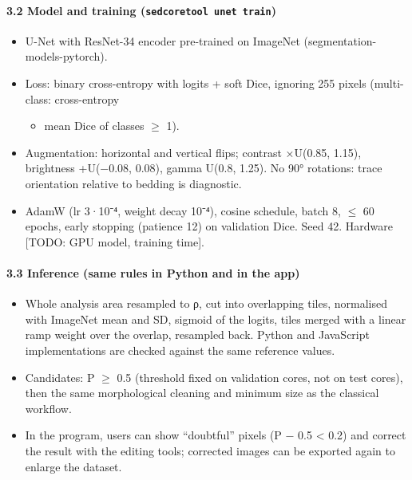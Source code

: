 \documentclass[
  10pt,
]{article}
\providecommand{\tightlist}{%
  \setlength{\itemsep}{0pt}\setlength{\parskip}{0pt}}
\begin{document}
\hypertarget{model-and-training-sedcoretool-unet-train}{%
\paragraph{\texorpdfstring{3.2 Model and training
(\texttt{sedcoretool\ unet\ train})}{3.2 Model and training (sedcoretool unet train)}}\label{model-and-training-sedcoretool-unet-train}}

\begin{itemize}
\tightlist
\item
  U-Net with ResNet-34 encoder pre-trained on ImageNet
  (segmentation-models-pytorch).
\item
  Loss: binary cross-entropy with logits + soft Dice, ignoring 255
  pixels (multi-class: cross-entropy

  \begin{itemize}
  \tightlist
  \item
    mean Dice of classes $\geq$ 1).
  \end{itemize}
\item
  Augmentation: horizontal and vertical flips; contrast ×U(0.85, 1.15),
  brightness +U(−0.08, 0.08), gamma U(0.8, 1.25). No 90° rotations:
  trace orientation relative to bedding is diagnostic.
\item
  AdamW (lr 3·10⁻⁴, weight decay 10⁻⁴), cosine schedule, batch 8, $\leq$ 60
  epochs, early stopping (patience 12) on validation Dice. Seed 42.
  Hardware {[}TODO: GPU model, training time{]}.
\end{itemize}

\hypertarget{inference-same-rules-in-python-and-in-the-app}{%
\paragraph{3.3 Inference (same rules in Python and in the
app)}\label{inference-same-rules-in-python-and-in-the-app}}

\begin{itemize}
\tightlist
\item
  Whole analysis area resampled to ρ, cut into overlapping tiles,
  normalised with ImageNet mean and SD, sigmoid of the logits, tiles
  merged with a linear ramp weight over the overlap, resampled back.
  Python and JavaScript implementations are checked against the same
  reference values.
\item
  Candidates: P $\geq$ 0.5 (threshold fixed on validation cores, not on test
  cores), then the same morphological cleaning and minimum size as the
  classical workflow.
\item
  In the program, users can show ``doubtful'' pixels (\textbar P −
  0.5\textbar{} \textless{} 0.2) and correct the result with the editing
  tools; corrected images can be exported again to enlarge the dataset.
\end{itemize}
\end{document}
